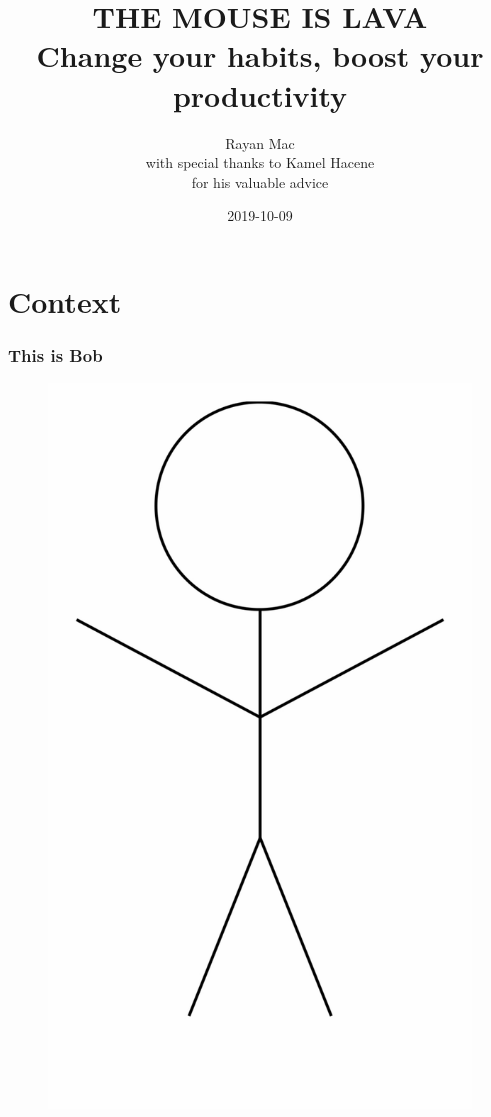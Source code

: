 \documentclass[aspectratio=169]{beamer}
\title{THE MOUSE IS LAVA \\ Change your habits, boost your productivity}
\author[shortname]{Rayan Mac\\[2mm]\footnotesize{with special thanks to Kamel Hacene\\for his valuable advice}}
\date{2019-10-09}
\begin{document}


\begin{frame}
  \titlepage
\end{frame}

\section*{Context}

\begin{frame}
  \frametitle{This is Bob}
    \begin{figure}[h]
        \includegraphics[scale=0.10]{./images/stickman.png}
    \end{figure}
\end{frame}
\end{document}
